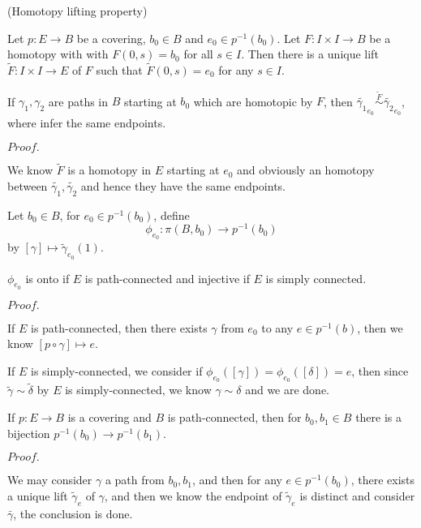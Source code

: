 \documentclass{article}
\newcommand{\Pf}[1]{$Proof.$\par}
\begin{document}
\begin{theorem}(Homotopy lifting property)\par
    Let $p:E\to B$ be a covering, $b_0 \in B$ and $e_0\in p^{-1}(b_0)$. Let $F:I\times I \to B$ be a homotopy with with $F(0,s) = b_0$ for all $s\in I$. Then there is a unique lift $\widetilde{F}:I\times I \to E$ of $F$ such that $\widetilde{F}(0,s) = e_0$ for any $s\in I$.
\end{theorem}

\begin{corollary}
    If $\gamma_1,\gamma_2$ are paths in $B$ starting at $b_0$ which are homotopic by $F$, then $\widetilde{\gamma_1}_{e_0} \overset{\widetilde{F}}{\sim} \widetilde{\gamma_2}_{e_0}$, where infer the same endpoints.
\end{corollary}
\Pf\par
We know $\widetilde{F}$ is a homotopy in $E$ starting at $e_0$ and obviously an homotopy between $\widetilde{\gamma_1},\widetilde{\gamma_2}$ and hence they have the same endpoints.

\begin{definition}
    Let $b_0\in B$, for $e_0 \in p^{-1}(b_0)$, define
    \[\phi_{e_0}:\pi(B,b_0) \to p^{-1}(b_0)\]
    by $[\gamma]\mapsto \widetilde{\gamma}_{e_0}(1)$. 
\end{definition}

\begin{theorem}
    $\phi_{e_0}$ is onto if $E$ is path-connected and injective if $E$ is simply connected.
\end{theorem}
\Pf\par
    If $E$ is path-connected, then there exists $\gamma$ from $e_0$ to any $e\in p^{-1}(b)$, then we know $[p\circ \gamma] \mapsto e$.\par
    If $E$ is simply-connected, we consider if $\phi_{e_0}([\gamma]) = \phi_{e_0}([\delta]) = e$, then since $\widetilde{\gamma} \sim \widetilde{\delta}$ by $E$ is simply-connected, we know $\gamma \sim \delta$ and we are done.

\begin{proposition}
    If $p:E\to B$ is a covering and $B$ is path-connected, then for $b_0,b_1 \in B$ there is a bijection $p^{-1}(b_0) \to p^{-1}(b_1)$.
\end{proposition}
\Pf\par
    We may consider $\gamma$ a path from $b_0,b_1$, and then for any $e\in p^{-1}(b_0)$, there exists a unique lift $\widetilde{\gamma}_{e}$ of $\gamma$, and then we know the endpoint of $\widetilde{\gamma}_{e}$ is distinct and consider $\bar{\gamma}$, the conclusion is done.
\end{document}
